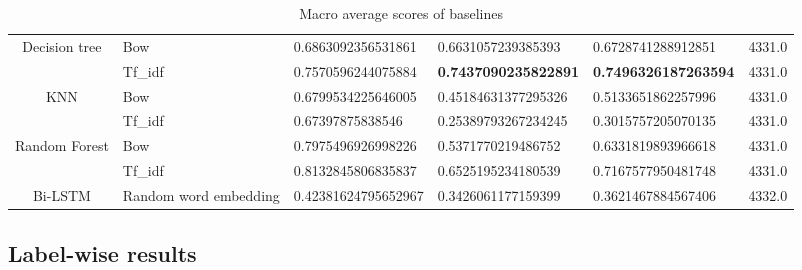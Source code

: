 \begin{table}[h!]
{\begin{tabular}{@{}clllll@{}}
\multicolumn{1}{|c|}{\multirow{2}{*}{Decision tree}} &
  \multicolumn{1}{l|}{Bow} &
  \multicolumn{1}{l|}{0.6863092356531861} &
  \multicolumn{1}{l|}{0.6631057239385393} &
  \multicolumn{1}{l|}{0.6728741288912851} &
  \multicolumn{1}{l|}{4331.0} \\ \cmidrule(l){2-6} 
\multicolumn{1}{|c|}{} &
  \multicolumn{1}{l|}{Tf\_idf} &
  \multicolumn{1}{l|}{0.7570596244075884} &
  \multicolumn{1}{l|}{\textbf{0.7437090235822891}} &
  \multicolumn{1}{l|}{\textbf{0.7496326187263594}} &
  \multicolumn{1}{l|}{4331.0} \\ \midrule
\multicolumn{1}{|c|}{\multirow{2}{*}{KNN}} &
  \multicolumn{1}{l|}{Bow} &
  \multicolumn{1}{l|}{0.6799534225646005} &
  \multicolumn{1}{l|}{0.45184631377295326} &
  \multicolumn{1}{l|}{0.5133651862257996} &
  \multicolumn{1}{l|}{4331.0} \\ \cmidrule(l){2-6} 
\multicolumn{1}{|c|}{} &
  \multicolumn{1}{l|}{Tf\_idf} &
  \multicolumn{1}{l|}{0.67397875838546} &
  \multicolumn{1}{l|}{0.25389793267234245} &
  \multicolumn{1}{l|}{0.3015757205070135} &
  \multicolumn{1}{l|}{4331.0} \\ \midrule
\multicolumn{1}{|l|}{\multirow{2}{*}{Random Forest}} &
  \multicolumn{1}{l|}{Bow} &
  \multicolumn{1}{l|}{0.7975496926998226} &
  \multicolumn{1}{l|}{0.5371770219486752} &
  \multicolumn{1}{l|}{0.6331819893966618} &
  \multicolumn{1}{l|}{4331.0} \\ \cmidrule(l){2-6} 
\multicolumn{1}{|l|}{} &
  \multicolumn{1}{l|}{Tf\_idf} &
  \multicolumn{1}{l|}{0.8132845806835837} &
  \multicolumn{1}{l|}{0.6525195234180539} &
  \multicolumn{1}{l|}{0.7167577950481748} &
  \multicolumn{1}{l|}{4331.0} \\ \midrule
\multicolumn{1}{|c|}{Bi-LSTM} &
  \multicolumn{1}{l|}{Random word embedding} &
  \multicolumn{1}{l|}{0.42381624795652967} &
  \multicolumn{1}{l|}{0.3426061177159399} &
  \multicolumn{1}{l|}{0.3621467884567406} &
  \multicolumn{1}{l|}{4332.0} \\ \bottomrule
\end{tabular}%
}
\caption{Macro average scores of baselines}
\label{tab:Macro-avg-baselines}
\end{table}
\pagebreak

\subsection{Label-wise results}
